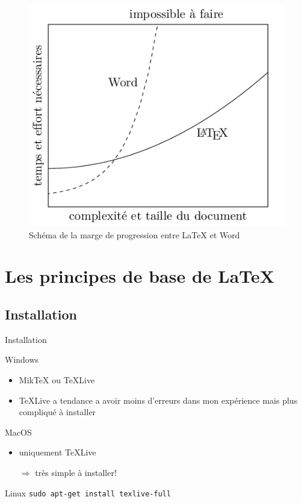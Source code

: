 \documentclass[8pt]{beamer}\usepackage[]{graphicx}\usepackage[]{xcolor}
\begin{document}
	\begin{frame}
	\begin{figure}[h!]
  \caption{Schéma de la marge de progression entre \LaTeX{} et Word}
  \label{exemple_ref}
  \centering
  \includegraphics[scale=0.5]{Images/latex_word.png}
\end{figure}
	\end{frame}
	\begin{frame}
    \tableofcontents
	\end{frame}


\section{Les principes de base de \LaTeX}
\subsection{Installation}

	\begin{frame}{Installation}
\begin{block}{Windows}
	    \begin{itemize}
	      \item Mik\TeX{} ou \TeX Live
	      \item \TeX Live a tendance a avoir moins d'erreurs dans mon expérience mais plus compliqué à installer
	    \end{itemize}
	  \end{block}
	  
\begin{block}{MacOS}
	    \begin{itemize}
	      \item uniquement \TeX Live
	      \item[$\Rightarrow$] très simple à installer!
	    \end{itemize}
	  \end{block}
	  
   \begin{block}{Linux}
    \texttt{sudo apt-get install texlive-full}
	  \end{block}
	\end{frame}
\end{document}
